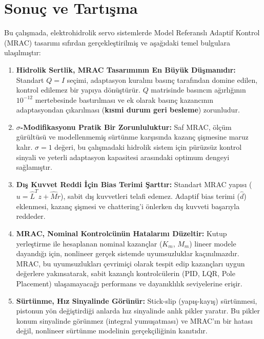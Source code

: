 \documentclass[12pt,a4paper]{article}
\begin{document}
\section{Sonuç ve Tartışma}
\label{sec:conclusion}

Bu çalışmada, elektrohidrolik servo sistemlerde Model Referanslı Adaptif Kontrol (MRAC) tasarımı sıfırdan gerçekleştirilmiş ve aşağıdaki temel bulgulara ulaşılmıştır:

\begin{enumerate}
    \item \textbf{Hidrolik Sertlik, MRAC Tasarımının En Büyük Düşmanıdır:} Standart $Q = I$ seçimi, adaptasyon kuralını basınç tarafından domine edilen, kontrol edilemez bir yapıya dönüştürür. $Q$ matrisinde basıncın ağırlığının $10^{-12}$ mertebesinde bastırılması ve ek olarak basınç kazancının adaptasyondan çıkarılması (\textbf{kısmi durum geri besleme}) zorunludur.

    \item \textbf{$\sigma$-Modifikasyonu Pratik Bir Zorunluluktur:} Saf MRAC, ölçüm gürültüsü ve modellenmemiş sürtünme karşısında kazanç şişmesine maruz kalır. $\sigma = 1$ değeri, bu çalışmadaki hidrolik sistem için pürüzsüz kontrol sinyali ve yeterli adaptasyon kapasitesi arasındaki optimum dengeyi sağlamıştır.

    \item \textbf{Dış Kuvvet Reddi İçin Bias Terimi Şarttır:} Standart MRAC yapısı ($u = \hat{L}^T z + \hat{M} r$), sabit dış kuvvetleri telafi edemez. Adaptif bias terimi ($\hat{d}$) eklenmesi, kazanç şişmesi ve chattering'i önlerken dış kuvveti başarıyla reddeder.

    \item \textbf{MRAC, Nominal Kontrolcünün Hatalarını Düzeltir:} Kutup yerleştirme ile hesaplanan nominal kazançlar ($K_m$, $M_m$) lineer modele dayandığı için, nonlineer gerçek sistemde uyumsuzluklar kaçınılmazdır. MRAC, bu uyumsuzlukları çevrimiçi olarak tespit edip kazançları uygun değerlere yakınsatarak, sabit kazançlı kontrolcülerin (PID, LQR, Pole Placement) ulaşamayacağı performans ve dayanıklılık seviyelerine erişir.

    \item \textbf{Sürtünme, Hız Sinyalinde Görünür:} Stick-slip (yapış-kayış) sürtünmesi, pistonun yön değiştirdiği anlarda hız sinyalinde anlık pikler yaratır. Bu pikler konum sinyalinde görünmez (integral yumuşatması) ve MRAC'ın bir hatası değil, nonlineer sürtünme modelinin gerçekçiliğinin kanıtıdır.
\end{enumerate}
\end{document}
